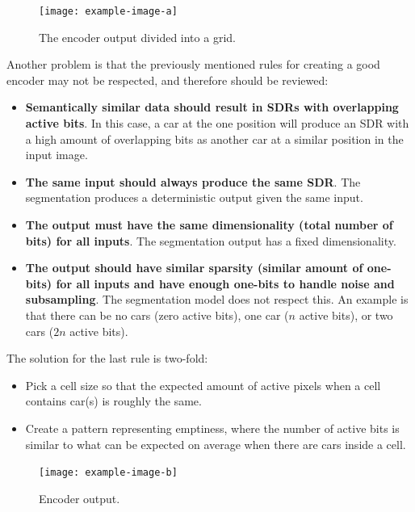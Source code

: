 \begin{figure}[H]
    \centering
    \texttt{[image: example-image-a]}
    \caption{The encoder output divided into a grid.}
    \label{fig:grid}
\end{figure}
Another problem is that the previously mentioned rules for creating a good encoder may not be respected, and therefore should be reviewed:
\begin{itemize}
    \item \textbf{Semantically similar data should result in SDRs with overlapping active bits}. In this case, a car at the one position will produce an SDR with a high amount of overlapping bits as another car at a similar position in the input image.
    \item \textbf{The same input should always produce the same SDR}. The segmentation produces a deterministic output given the same input.
    \item \textbf{The output must have the same dimensionality (total number of bits) for all inputs}. The segmentation output has a fixed dimensionality.
    \item \textbf{The output should have similar sparsity (similar amount of one-bits) for all inputs and have enough one-bits to handle noise and subsampling}. The segmentation model does not respect this. An example is that there can be no cars (zero active bits), one car ($n$ active bits), or two cars ($2n$ active bits).
\end{itemize}
The solution for the last rule is two-fold:
\begin{itemize}
    \item Pick a cell size so that the expected amount of active pixels when a cell contains car(s) is roughly the same.
    \item Create a pattern representing emptiness, where the number of active bits is similar to what can be expected on average when there are cars inside a cell.
\end{itemize}
\begin{figure}[H]
    \centering
    \texttt{[image: example-image-b]}
    \caption{Encoder output.}
    \label{fig:encoder_output}
\end{figure}

